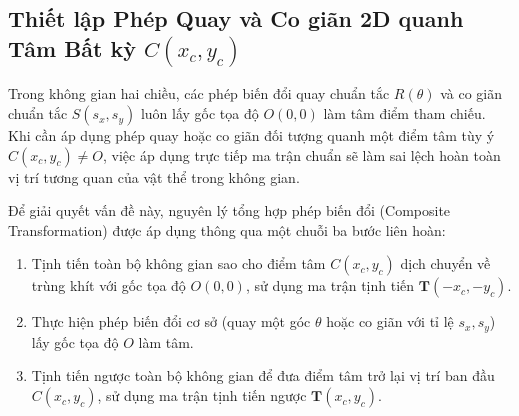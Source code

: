 \subsection{Thiết lập Phép Quay và Co giãn 2D quanh Tâm Bất kỳ \texorpdfstring{$C(x_c, y_c)$}{C(xc, yc)}}
\label{subsec:rotate_scale_arbitrary_pivot}

Trong không gian hai chiều, các phép biến đổi quay chuẩn tắc $R(\theta)$ và co giãn chuẩn tắc $S(s_x, s_y)$ luôn lấy gốc tọa độ $O(0, 0)$ làm tâm điểm tham chiếu. Khi cần áp dụng phép quay hoặc co giãn đối tượng quanh một điểm tâm tùy ý $C(x_c, y_c) \neq O$, việc áp dụng trực tiếp ma trận chuẩn sẽ làm sai lệch hoàn toàn vị trí tương quan của vật thể trong không gian.

Để giải quyết vấn đề này, nguyên lý tổng hợp phép biến đổi (Composite Transformation) được áp dụng thông qua một chuỗi ba bước liên hoàn:
\begin{enumerate}
    \item Tịnh tiến toàn bộ không gian sao cho điểm tâm $C(x_c, y_c)$ dịch chuyển về trùng khít với gốc tọa độ $O(0, 0)$, sử dụng ma trận tịnh tiến $\mathbf{T}(-x_c, -y_c)$.
    \item Thực hiện phép biến đổi cơ sở (quay một góc $\theta$ hoặc co giãn với tỉ lệ $s_x, s_y$) lấy gốc tọa độ $O$ làm tâm.
    \item Tịnh tiến ngược toàn bộ không gian để đưa điểm tâm trở lại vị trí ban đầu $C(x_c, y_c)$, sử dụng ma trận tịnh tiến ngược $\mathbf{T}(x_c, y_c)$.
\end{enumerate}

